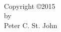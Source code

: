 \null
\vfill
\begin{center}
  \thetitle\\[2ex]
  Copyright \copyright 2015\\
  by\\
  Peter C. St. John
\end{center}
